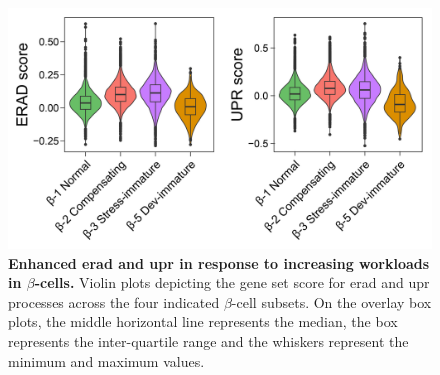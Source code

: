 \begin{figure}[H]
\centering
\includegraphics[width=\linewidth]{Chapter5/Fig/F3-22-01.png}
\caption[Enhanced  and  in response to increasing workloads in $\beta$-cells]{\textbf{Enhanced \gls{erad} and \gls{upr} in response to increasing workloads in $\beta$-cells.} Violin plots depicting the gene set score for \gls{erad} and \gls{upr} processes across the four indicated $\beta$-cell subsets. On the overlay box plots, the middle horizontal line represents the median, the box represents the inter-quartile range and the whiskers represent the minimum and maximum values.}
\label{fig:chp3_eradupr}
\end{figure}


